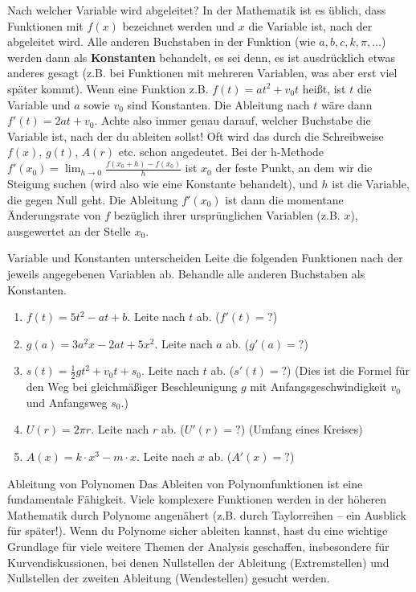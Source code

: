 \begin{tippumgebung}{Nach welcher Variable wird abgeleitet?}
In der Mathematik ist es üblich, dass Funktionen mit $f(x)$ bezeichnet werden und $x$ die Variable ist, nach der abgeleitet wird. Alle anderen Buchstaben in der Funktion (wie $a, b, c, k, \pi, \dots$) werden dann als \textbf{Konstanten} behandelt, es sei denn, es ist ausdrücklich etwas anderes gesagt (z.B. bei Funktionen mit mehreren Variablen, was aber erst viel später kommt).
Wenn eine Funktion z.B. $f(t) = at^2 + v_0t$ heißt, ist $t$ die Variable und $a$ sowie $v_0$ sind Konstanten. Die Ableitung nach $t$ wäre dann $f'(t) = 2at + v_0$.
Achte also immer genau darauf, welcher Buchstabe die Variable ist, nach der du ableiten sollst! Oft wird das durch die Schreibweise $f(x)$, $g(t)$, $A(r)$ etc. schon angedeutet.
Bei der h-Methode $f'(x_0) = \lim_{h \to 0} \frac{f(x_0+h) - f(x_0)}{h}$ ist $x_0$ der feste Punkt, an dem wir die Steigung suchen (wird also wie eine Konstante behandelt), und $h$ ist die Variable, die gegen Null geht. Die Ableitung $f'(x_0)$ ist dann die momentane Änderungsrate von $f$ bezüglich ihrer ursprünglichen Variablen (z.B. $x$), ausgewertet an der Stelle $x_0$.
\end{tippumgebung}

\begin{aufgabenumgebung}{Variable und Konstanten unterscheiden}
Leite die folgenden Funktionen nach der jeweils angegebenen Variablen ab. Behandle alle anderen Buchstaben als Konstanten.
\begin{enumerate}
    \item $f(t) = 5t^2 - at + b$. Leite nach $t$ ab. ($f'(t) = ?$)
    \item $g(a) = 3a^2x - 2at + 5x^2$. Leite nach $a$ ab. ($g'(a) = ?$)
    \item $s(t) = \frac{1}{2}gt^2 + v_0 t + s_0$. Leite nach $t$ ab. ($s'(t) = ?$) (Dies ist die Formel für den Weg bei gleichmäßiger Beschleunigung $g$ mit Anfangsgeschwindigkeit $v_0$ und Anfangsweg $s_0$.)
    \item $U(r) = 2\pi r$. Leite nach $r$ ab. ($U'(r) = ?$) (Umfang eines Kreises)
    \item $A(x) = k \cdot x^3 - m \cdot x$. Leite nach $x$ ab. ($A'(x) = ?$)
\end{enumerate}
\end{aufgabenumgebung}

\begin{warumwichtigumgebung}{Ableitung von Polynomen}
Das Ableiten von Polynomfunktionen ist eine fundamentale Fähigkeit. Viele komplexere Funktionen werden in der höheren Mathematik durch Polynome angenähert (z.B. durch Taylorreihen – ein Ausblick für später!). Wenn du Polynome sicher ableiten kannst, hast du eine wichtige Grundlage für viele weitere Themen der Analysis geschaffen, insbesondere für Kurvendiskussionen, bei denen Nullstellen der Ableitung (Extremstellen) und Nullstellen der zweiten Ableitung (Wendestellen) gesucht werden.
\end{warumwichtigumgebung}




